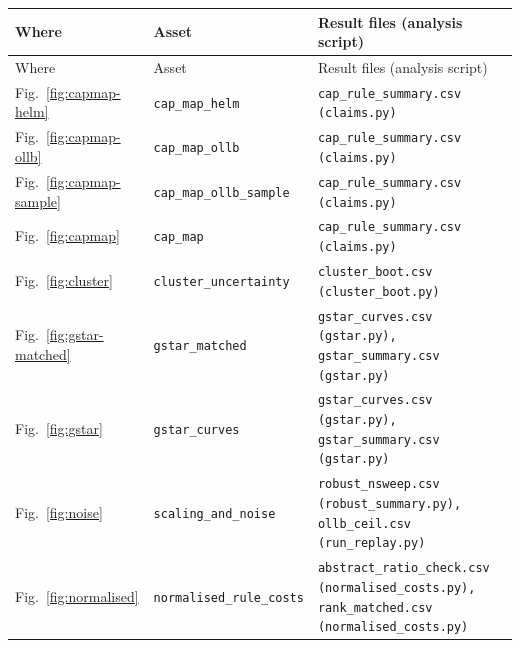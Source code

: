 \begingroup
{}\label{tab:map}
\fontsize{8}{9.5}\selectfont
\begin{longtable}{@{}p{0.55in} p{1.55in} p{3.0in}@{}}
\toprule
Where & Asset & Result files (analysis script) \\
\midrule
\endfirsthead
\toprule
Where & Asset & Result files (analysis script) \\
\midrule
\endhead
\bottomrule
\endlastfoot
Fig.~\ref{fig:capmap-helm} & \texttt{cap\_\allowbreak map\_\allowbreak helm} & \texttt{cap\_\allowbreak rule\_\allowbreak summary.csv (claims.py)} \\
Fig.~\ref{fig:capmap-ollb} & \texttt{cap\_\allowbreak map\_\allowbreak ollb} & \texttt{cap\_\allowbreak rule\_\allowbreak summary.csv (claims.py)} \\
Fig.~\ref{fig:capmap-sample} & \texttt{cap\_\allowbreak map\_\allowbreak ollb\_\allowbreak sample} & \texttt{cap\_\allowbreak rule\_\allowbreak summary.csv (claims.py)} \\
Fig.~\ref{fig:capmap} & \texttt{cap\_\allowbreak map} & \texttt{cap\_\allowbreak rule\_\allowbreak summary.csv (claims.py)} \\
Fig.~\ref{fig:cluster} & \texttt{cluster\_\allowbreak uncertainty} & \texttt{cluster\_\allowbreak boot.csv (cluster\_\allowbreak boot.py)} \\
Fig.~\ref{fig:gstar-matched} & \texttt{gstar\_\allowbreak matched} & \texttt{gstar\_\allowbreak curves.csv (gstar.py), gstar\_\allowbreak summary.csv (gstar.py)} \\
Fig.~\ref{fig:gstar} & \texttt{gstar\_\allowbreak curves} & \texttt{gstar\_\allowbreak curves.csv (gstar.py), gstar\_\allowbreak summary.csv (gstar.py)} \\
Fig.~\ref{fig:noise} & \texttt{scaling\_\allowbreak and\_\allowbreak noise} & \texttt{robust\_\allowbreak nsweep.csv (robust\_\allowbreak summary.py), ollb\_\allowbreak ceil.csv (run\_\allowbreak replay.py)} \\
Fig.~\ref{fig:normalised} & \texttt{normalised\_\allowbreak rule\_\allowbreak costs} & \texttt{abstract\_\allowbreak ratio\_\allowbreak check.csv (normalised\_\allowbreak costs.py), rank\_\allowbreak matched.csv (normalised\_\allowbreak costs.py)} \\

\end{longtable}
